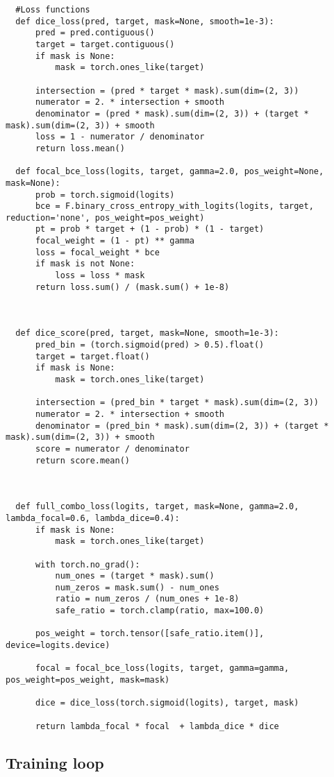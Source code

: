 \documentclass[a4paper,12pt]{article}
\begin{document}
\begin{lstlisting}
  #Loss functions
  def dice_loss(pred, target, mask=None, smooth=1e-3):
      pred = pred.contiguous()
      target = target.contiguous()
      if mask is None:
          mask = torch.ones_like(target)
  
      intersection = (pred * target * mask).sum(dim=(2, 3))
      numerator = 2. * intersection + smooth
      denominator = (pred * mask).sum(dim=(2, 3)) + (target * mask).sum(dim=(2, 3)) + smooth
      loss = 1 - numerator / denominator
      return loss.mean()
  
  def focal_bce_loss(logits, target, gamma=2.0, pos_weight=None, mask=None):
      prob = torch.sigmoid(logits)
      bce = F.binary_cross_entropy_with_logits(logits, target, reduction='none', pos_weight=pos_weight)
      pt = prob * target + (1 - prob) * (1 - target)
      focal_weight = (1 - pt) ** gamma
      loss = focal_weight * bce
      if mask is not None:
          loss = loss * mask
      return loss.sum() / (mask.sum() + 1e-8)
  
  
  
  def dice_score(pred, target, mask=None, smooth=1e-3):
      pred_bin = (torch.sigmoid(pred) > 0.5).float()
      target = target.float()
      if mask is None:
          mask = torch.ones_like(target)
  
      intersection = (pred_bin * target * mask).sum(dim=(2, 3))
      numerator = 2. * intersection + smooth
      denominator = (pred_bin * mask).sum(dim=(2, 3)) + (target * mask).sum(dim=(2, 3)) + smooth
      score = numerator / denominator
      return score.mean()
  
  
  
  def full_combo_loss(logits, target, mask=None, gamma=2.0, lambda_focal=0.6, lambda_dice=0.4):
      if mask is None:
          mask = torch.ones_like(target)
  
      with torch.no_grad():
          num_ones = (target * mask).sum()
          num_zeros = mask.sum() - num_ones
          ratio = num_zeros / (num_ones + 1e-8)
          safe_ratio = torch.clamp(ratio, max=100.0)
  
      pos_weight = torch.tensor([safe_ratio.item()], device=logits.device)
  
      focal = focal_bce_loss(logits, target, gamma=gamma, pos_weight=pos_weight, mask=mask)
  
      dice = dice_loss(torch.sigmoid(logits), target, mask)
  
      return lambda_focal * focal  + lambda_dice * dice
\end{lstlisting}
\hypertarget{sec:training}{\subsection{Training loop}}
\end{document}
